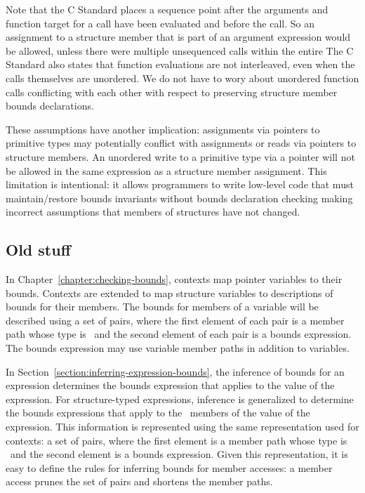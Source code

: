 \begin{itemize}
Note that the C Standard places a sequence point after the arguments and function target for a call have been 
evaluated and before the call.  So an assignment to a structure member that is part of an argument 
expression would be allowed, unless there were multiple unsequenced calls within the entire 
The C Standard also states that
function evaluations are not interleaved, even when the calls themselves are unordered.  We do
not have to wory about unordered function calls conflicting with each other with respect to preserving
structure member bounds declarations.
\end{itemize}

These assumptions have another implication: assignments via pointers to primitive types
may potentially conflict with assignments or reads via pointers to structure members.  An unordered
write to a primitive type via a pointer will not be allowed in the same expression as a 
structure member assignment.  This limitation is intentional: it allows programmers to write
low-level code that must maintain/restore bounds invariants without bounds declaration
checking making incorrect assumptions that members of structures have not changed.

\subsection{Old stuff}

In Chapter~\ref{chapter:checking-bounds}, contexts map pointer variables to their bounds.
Contexts are extended to map structure variables to descriptions of bounds for their
members.  The bounds for members of a variable will be described using a set of pairs,
where the first element of each pair is a member path whose type is \arrayptr\
and the second element of each pair is a bounds expression.  The bounds expression may use 
variable member paths in addition to variables.

In Section~\ref{section:inferring-expression-bounds}, the inference of bounds for an
expression determines the bounds expression that applies to the value of the
expression.  For structure-typed expressions, inference is generalized to determine
the bounds expressions that apply to the \arrayptr\ members of the value 
of the expression.  This information is represented using the same
representation used for contexts: a set of pairs, where the first element 
is a member path whose type is \arrayptr\ and the second element is a 
bounds expression.  Given this representation, it is easy to define
the rules for inferring bounds for member accesses: a member access prunes the
set of pairs and shortens the member paths.

